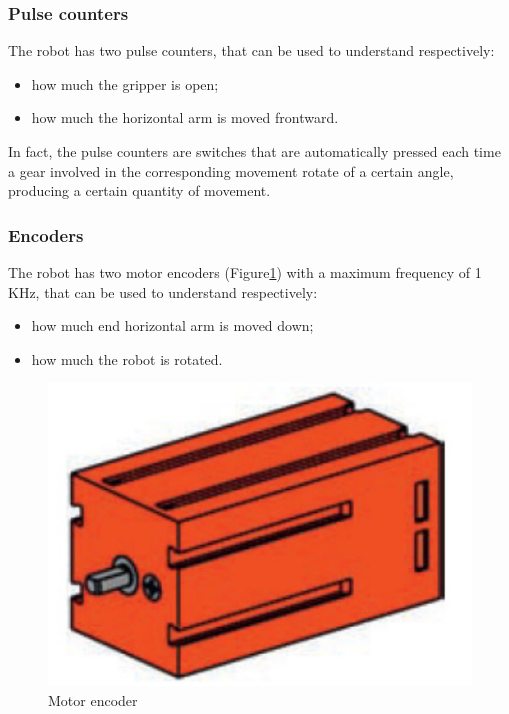 \subsubsection{Pulse counters}
The robot has two pulse counters, that can be used to understand respectively:
\begin{itemize}
    \item how much the gripper is open;
    \item how much the horizontal arm is moved frontward.
\end{itemize}

In fact, the pulse counters are switches that are automatically pressed each time a gear involved in the corresponding movement rotate of a certain angle, producing a certain quantity of movement.

\subsubsection{Encoders}
The robot has two motor encoders (Figure\ref{fig:encoder}) with a maximum frequency of 1 KHz, that can be used to understand respectively:
\begin{itemize}
    \item how much end horizontal arm is moved down;
    \item how much the robot is rotated.
\end{itemize}

\begin{figure}[!h]
\begin{center}
\includegraphics[width=0.4\linewidth]{capitolo2/figure/encoder.png}
\caption{Motor encoder}
\label{fig:encoder}
\end{center}
\end{figure}

